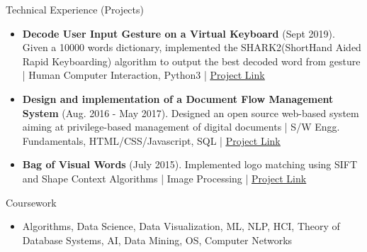 \documentclass[]{mcdowellcv}
\begin{document}
\begin{cvsection}{Technical Experience (Projects)}
		\begin{cvsubsection}{}{}{}
			\begin{itemize}
				
				\item \textbf{Decode User Input Gesture on a Virtual Keyboard} (Sept 2019). Given a 10000 words dictionary, implemented the SHARK2(ShortHand Aided Rapid Keyboarding) algorithm to output the best decoded word from gesture | Human Computer Interaction, Python3 |  \underline{\href{https://github.com/Trisha11r/Decode_Gesture_SHARK2_algo}{Project Link}}
			\end{itemize}
		\end{cvsubsection}
				
		\begin{cvsubsection}{}{}{}
		    \begin{itemize}
				
				\item \textbf{Design and implementation of a Document Flow Management System} (Aug. 2016 - May 2017). Designed an open source web-based system aiming at privilege-based management of digital documents | S/W Engg. Fundamentals, HTML/CSS/Javascript, SQL |  \underline{\href{https://github.com/Trisha11r/Document-Flow-Management-System}{Project Link}}
			\end{itemize}
		\end{cvsubsection}
		\begin{cvsubsection}{}{}{}
		    \begin{itemize}
				
				\item \textbf{Bag of Visual Words} (July 2015). Implemented logo matching using SIFT and Shape Context Algorithms | Image Processing |  \underline{\href{https://github.com/Trisha11r/Bag_of_Visual_Words}{Project Link}}
			\end{itemize}
		\end{cvsubsection}
		
		
	\end{cvsection}
	
	\begin{cvsection}{Coursework}
		\begin{cvsubsection}{}{}{}	
			\begin{itemize}
				\item Algorithms, Data Science, Data Visualization, ML, NLP, HCI, Theory of Database Systems, AI, Data Mining, OS, Computer Networks
				
			\end{itemize}
		\end{cvsubsection}
	\end{cvsection}
	
\end{document}
